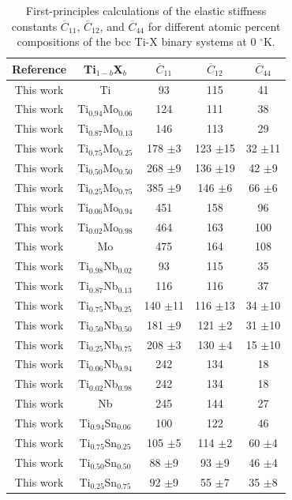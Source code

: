 \newpage
\begin{longtable}[H]{ c c c c c}
	\caption{First-principles calculations of the elastic stiffness constants $\overline{C}_{11}$, $\overline{C}_{12}$, and $\overline{C}_{44}$ for different atomic percent compositions of the bcc Ti-X binary systems at 0 $^\circ$K.}	\label{Ch5-table:tixelassc} \\
	\hline
	Reference & Ti$_{1-b}$X$_b$ & $\overline{C}_{11}$ & $\overline{C}_{12}$ & $\overline{C}_{44}$\\
	\hline
	\endhead
	\hline
	\endfoot
	This work & Ti & 93 & 115 & 41\\
	This work & Ti$_{0.94}$Mo$_{0.06}$ & 124 & 111 & 38\\
	This work & Ti$_{0.87}$Mo$_{0.13}$ & 146 & 113 & 29\\
	This work & Ti$_{0.75}$Mo$_{0.25}$ & 178 $\pm$3 & 123 $\pm$15 & 32 $\pm$11\\
	This work & Ti$_{0.50}$Mo$_{0.50}$ & 268 $\pm$9 & 136 $\pm$19 & 42 $\pm$9\\
	This work & Ti$_{0.25}$Mo$_{0.75}$ & 385 $\pm$9 & 146 $\pm$6 & 66 $\pm$6\\
	This work & Ti$_{0.06}$Mo$_{0.94}$ & 451 & 158 & 96\\
	This work & Ti$_{0.02}$Mo$_{0.98}$ & 464 & 163 & 100\\
	This work & Mo & 475 & 164 & 108\\
	This work & Ti$_{0.98}$Nb$_{0.02}$ & 93 & 115 & 35\\
	This work & Ti$_{0.87}$Nb$_{0.13}$ & 116 & 116 & 37\\
	This work & Ti$_{0.75}$Nb$_{0.25}$ & 140 $\pm$11 & 116 $\pm$13 & 34 $\pm$10\\
	This work & Ti$_{0.50}$Nb$_{0.50}$ & 181 $\pm$9 & 121 $\pm$2 & 31 $\pm$10\\
	This work & Ti$_{0.25}$Nb$_{0.75}$ & 208 $\pm$3 & 130 $\pm$4 & 15 $\pm$10\\
	This work & Ti$_{0.06}$Nb$_{0.94}$ & 242 & 134 & 18\\
	This work & Ti$_{0.02}$Nb$_{0.98}$ & 242 & 134 & 18\\
	This work & Nb & 245 & 144 & 27\\
	This work & Ti$_{0.94}$Sn$_{0.06}$ & 100 & 122 & 46 \\
	This work & Ti$_{0.75}$Sn$_{0.25}$ & 105 $\pm$5 & 114 $\pm$2 & 60 $\pm$4\\
	This work & Ti$_{0.50}$Sn$_{0.50}$ & 88 $\pm$9 & 93 $\pm$9 & 46 $\pm$4\\
	This work & Ti$_{0.25}$Sn$_{0.75}$ & 92 $\pm$9 & 55 $\pm$7 & 35 $\pm$8\\

\end{longtable}
